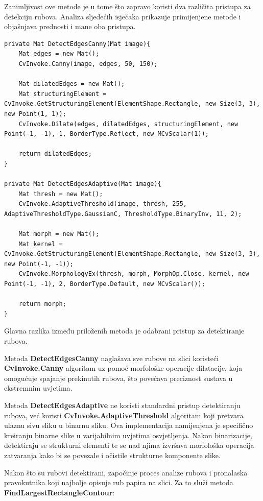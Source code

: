 \documentclass{foi}
\begin{document}
Zanimljivost ove metode je u tome što zapravo koristi dva različita pristupa za detekciju rubova. Analiza sljedećih isječaka prikazuje primijenjene metode i objašnjava prednosti i mane oba pristupa.

\pagebreak
\begin{lstlisting}[caption={Metoda za detekciju rubova tijekom ispravka perspektive}]
private Mat DetectEdgesCanny(Mat image){
    Mat edges = new Mat();
    CvInvoke.Canny(image, edges, 50, 150);

    Mat dilatedEdges = new Mat();
    Mat structuringElement = CvInvoke.GetStructuringElement(ElementShape.Rectangle, new Size(3, 3), new Point(1, 1));
    CvInvoke.Dilate(edges, dilatedEdges, structuringElement, new Point(-1, -1), 1, BorderType.Reflect, new MCvScalar(1));

    return dilatedEdges;
}

private Mat DetectEdgesAdaptive(Mat image){
    Mat thresh = new Mat();
    CvInvoke.AdaptiveThreshold(image, thresh, 255, AdaptiveThresholdType.GaussianC, ThresholdType.BinaryInv, 11, 2);

    Mat morph = new Mat();
    Mat kernel = CvInvoke.GetStructuringElement(ElementShape.Rectangle, new Size(3, 3), new Point(-1, -1));
    CvInvoke.MorphologyEx(thresh, morph, MorphOp.Close, kernel, new Point(-1, -1), 2, BorderType.Default, new MCvScalar());

    return morph;
}
\end{lstlisting}

Glavna razlika između priloženih metoda je odabrani pristup za detektiranje rubova.

Metoda \textbf{DetectEdgesCanny} naglašava sve rubove na slici koristeći \textbf{CvInvoke.Canny} algoritam uz pomoć morfološke operacije dilatacije, koja omogućuje spajanje prekinutih rubova, što povećava preciznost sustava u ekstremnim uvjetima.

Metoda \textbf{DetectEdgesAdaptive} ne koristi standardni pristup detektiranju rubova, već koristi \textbf{CvInvoke.AdaptiveThreshold} algoritam koji pretvara ulaznu sivu sliku u binarnu sliku. Ova implementacija namijenjena je specifično kreiranju binarne slike u varijabilnim uvjetima osvjetljenja. Nakon binarizacije, detektiraju se strukturni elementi te se nad njima izvršava morfološka operacija zatvaranja kako bi se povezale i očistile strukturne komponente slike.


Nakon što su rubovi detektirani, započinje proces analize rubova i pronalaska pravokutnika koji najbolje opisuje rub papira na slici. Za to služi metoda \textbf{FindLargestRectangleContour}:
\end{document}
